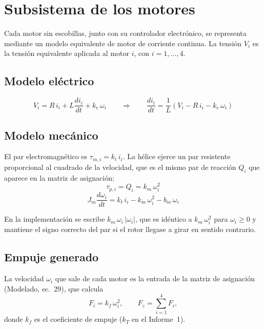 \section{Subsistema de los motores}
\label{sec:motor}

Cada motor sin escobillas, junto con su controlador electrónico, se representa mediante
un modelo equivalente de motor de corriente continua. La tensión $V_i$ es la tensión
equivalente aplicada al motor $i$, con $i = 1,\dots,4$.

\subsection{Modelo eléctrico}
\begin{equation}
  V_i = R\, i_i + L \frac{d i_i}{dt} + k_e\, \omega_i
  \qquad\Longrightarrow\qquad
  \frac{d i_i}{dt} = \frac{1}{L}\left(V_i - R\, i_i - k_e\, \omega_i\right)
  \label{eq:motor_elec}
\end{equation}

\subsection{Modelo mecánico}
El par electromagnético es $\tau_{m,i} = k_t\, i_i$. La hélice ejerce un par resistente
proporcional al cuadrado de la velocidad, que es el mismo par de reacción $Q_i$ que
aparece en la matriz de asignación:
\begin{equation}
  \tau_{p,i} = Q_i = k_m\, \omega_i^2
  \label{eq:motor_tau_p}
\end{equation}
\begin{equation}
  J_m \frac{d\omega_i}{dt} = k_t\, i_i - k_m\, \omega_i^2 - b_m\, \omega_i
  \label{eq:motor_mec}
\end{equation}

En la implementación se escribe $k_m\,\omega_i\,|\omega_i|$, que es idéntico a
$k_m\,\omega_i^2$ para $\omega_i \ge 0$ y mantiene el signo correcto del par si el
rotor llegase a girar en sentido contrario.

\subsection{Empuje generado}
La velocidad $\omega_i$ que sale de cada motor es la entrada de la matriz de asignación
(Modelado, ec.~29), que calcula
\begin{equation}
  F_i = k_f\, \omega_i^2, \qquad F_z = \sum_{i=1}^{4} F_i ,
\end{equation}
donde $k_f$ es el coeficiente de empuje ($k_T$ en el Informe~1).

